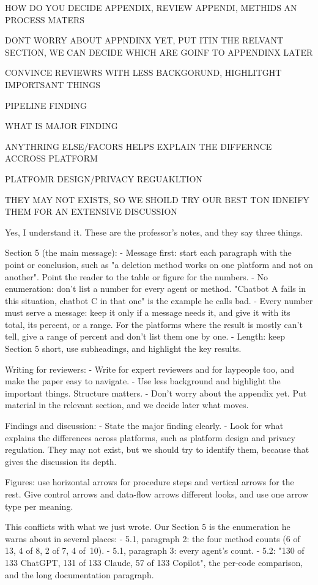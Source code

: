 HOW DO YOU DECIDE APPENDIX, REVIEW APPENDI, METHIDS AN PROCESS MATERS

DONT WORRY ABOUT APPNDINX YET, PUT ITIN THE RELVANT SECTION, WE CAN DECIDE WHICH ARE GOINF TO  APPENDINX LATER


CONVINCE REVIEWRS WITH LESS BACKGORUND, HIGHLITGHT IMPORTSANT THINGS

PIPELINE 
FINDING


WHAT IS MAJOR FINDING

ANYTHRING ELSE/FACORS HELPS EXPLAIN THE DIFFERNCE ACCROSS PLATFORM

PLATFOMR DESIGN/PRIVACY REGUAKLTION

THEY MAY NOT EXISTS, SO WE SHOILD TRY OUR BEST TON IDNEIFY THEM FOR AN EXTENSIVE DISCUSSION


Yes, I understand it. These are the professor's notes, and they say three things.

Section 5 (the main message):
- Message first: start each paragraph with the point or conclusion, such as "a deletion method works on one platform and not on another". Point the reader to the table or figure for the numbers.
- No enumeration: don't list a number for every agent or method. "Chatbot A fails in this situation, chatbot C in that one" is the example he calls bad.
- Every number must serve a message: keep it only if a message needs it, and give it with its total, its percent, or a range. For the platforms where the result is mostly can't tell, give a range of percent and don't list them one by one.
- Length: keep Section 5 short, use subheadings, and highlight the key results.

Writing for reviewers:
- Write for expert reviewers and for laypeople too, and make the paper easy to navigate.
- Use less background and highlight the important things. Structure matters.
- Don't worry about the appendix yet. Put material in the relevant section, and we decide later what moves.

Findings and discussion:
- State the major finding clearly.
- Look for what explains the differences across platforms, such as platform design and privacy regulation. They may not exist, but we should try to identify them, because that gives the discussion its depth.

Figures: use horizontal arrows for procedure steps and vertical arrows for the rest. Give control arrows and data-flow arrows different looks, and use one arrow type per meaning.

This conflicts with what we just wrote. Our Section 5 is the enumeration he warns about in several places:
- 5.1, paragraph 2: the four method counts (6 of 13, 4 of 8, 2 of 7, 4 of 10).
- 5.1, paragraph 3: every agent's count.
- 5.2: "130 of 133 ChatGPT, 131 of 133 Claude, 57 of 133 Copilot", the per-code comparison, and the long documentation paragraph.

